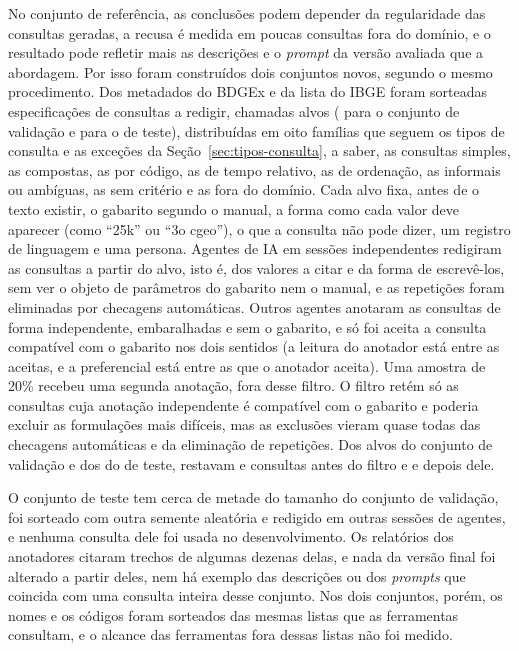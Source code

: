 No conjunto de referência, as conclusões podem depender da regularidade das consultas geradas, a recusa é medida em poucas consultas fora do domínio, e o resultado pode refletir mais as descrições e o \textit{prompt} da versão avaliada que a abordagem. Por isso foram construídos dois conjuntos novos, segundo o mesmo procedimento. Dos metadados do BDGEx e da lista do IBGE foram sorteadas especificações de consultas a redigir, chamadas alvos ( para o conjunto de validação e  para o de teste), distribuídas em oito famílias que seguem os tipos de consulta e as exceções da Seção~\ref{sec:tipos-consulta}, a saber, as consultas simples, as compostas, as por código, as de tempo relativo, as de ordenação, as informais ou ambíguas, as sem critério e as fora do domínio. Cada alvo fixa, antes de o texto existir, o gabarito segundo o manual, a forma como cada valor deve aparecer (como ``25k'' ou ``3o cgeo''), o que a consulta não pode dizer, um registro de linguagem e uma persona. Agentes de IA em sessões independentes redigiram as consultas a partir do alvo, isto é, dos valores a citar e da forma de escrevê-los, sem ver o objeto de parâmetros do gabarito nem o manual, e as repetições foram eliminadas por checagens automáticas. Outros agentes anotaram as consultas de forma independente, embaralhadas e sem o gabarito, e só foi aceita a consulta compatível com o gabarito nos dois sentidos (a leitura do anotador está entre as aceitas, e a preferencial está entre as que o anotador aceita). Uma amostra de 20\% recebeu uma segunda anotação, fora desse filtro. O filtro retém só as consultas cuja anotação independente é compatível com o gabarito e poderia excluir as formulações mais difíceis, mas as exclusões vieram quase todas das checagens automáticas e da eliminação de repetições. Dos  alvos do conjunto de validação e dos  do de teste, restavam  e  consultas antes do filtro e  e  depois dele.

O conjunto de teste tem cerca de metade do tamanho do conjunto de validação, foi sorteado com outra semente aleatória e redigido em outras sessões de agentes, e nenhuma consulta dele foi usada no desenvolvimento. Os relatórios dos anotadores citaram trechos de algumas dezenas delas, e nada da versão final foi alterado a partir deles, nem há exemplo das descrições ou dos \textit{prompts} que coincida com uma consulta inteira desse conjunto. Nos dois conjuntos, porém, os nomes e os códigos foram sorteados das mesmas listas que as ferramentas consultam, e o alcance das ferramentas fora dessas listas não foi medido.

